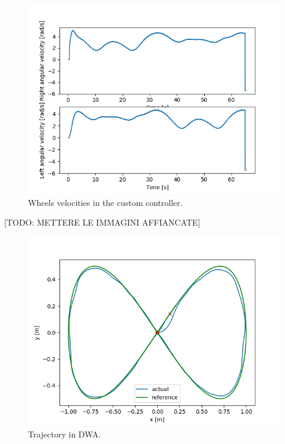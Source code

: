 \documentclass[11pt,a4paper]{article}
\begin{document}
\begin{figure}[H]
    \centering
    \includegraphics[scale=0.4]{kin_screenshots/Wheels_Velocities.png}
    \caption{Wheels velocities in the custom controller.}
\end{figure}

[TODO: METTERE LE IMMAGINI AFFIANCATE]

\begin{figure}[H]
    \centering
    \includegraphics[scale=0.4]{dwa_screenshots/Trajectory.png}
    \caption{Trajectory in DWA.}
\end{figure}
\end{document}
